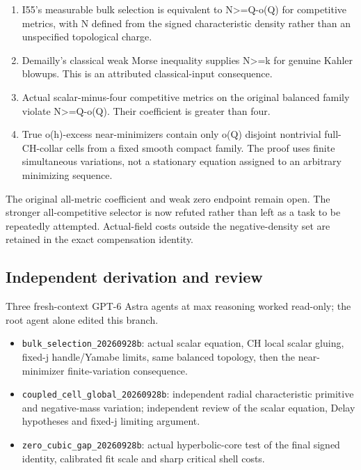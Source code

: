 \documentclass[
  10pt,
]{article}
\providecommand{\tightlist}{%
  \setlength{\itemsep}{0pt}\setlength{\parskip}{0pt}}
\begin{document}
\begin{enumerate}
\def\labelenumi{\arabic{enumi}.}
\tightlist
\item
  I55's measurable bulk selection is equivalent to N\textgreater=Q-o(Q)
  for competitive metrics, with N defined from the signed characteristic
  density rather than an unspecified topological charge.
\item
  Demailly's classical weak Morse inequality supplies N\textgreater=k
  for genuine Kahler blowups. This is an attributed classical-input
  consequence.
\item
  Actual scalar-minus-four competitive metrics on the original balanced
  family violate N\textgreater=Q-o(Q). Their coefficient is greater than
  four.
\item
  True o(h)-excess near-minimizers contain only o(Q) disjoint nontrivial
  full-CH-collar cells from a fixed smooth compact family. The proof
  uses finite simultaneous variations, not a stationary equation
  assigned to an arbitrary minimizing sequence.
\end{enumerate}

The original all-metric coefficient and weak zero endpoint remain open.
The stronger all-competitive selector is now refuted rather than left as
a task to be repeatedly attempted. Actual-field costs outside the
negative-density set are retained in the exact compensation identity.

\hypertarget{independent-derivation-and-review}{%
\subsection{Independent derivation and
review}\label{independent-derivation-and-review}}

Three fresh-context GPT-6 Astra agents at max reasoning worked
read-only; the root agent alone edited this branch.

\begin{itemize}
\tightlist
\item
  \nolinkurl{bulk_selection_20260928b}: actual scalar equation, CH local
  scalar gluing, fixed-j handle/Yamabe limits, same balanced topology,
  then the near-minimizer finite-variation consequence.
\item
  \nolinkurl{coupled_cell_global_20260928b}: independent radial
  characteristic primitive and negative-mass variation; independent
  review of the scalar equation, Delay hypotheses and fixed-j limiting
  argument.
\item
  \nolinkurl{zero_cubic_gap_20260928b}: actual hyperbolic-core test of
  the final signed identity, calibrated fit scale and sharp critical
  shell costs.
\end{itemize}
\end{document}
